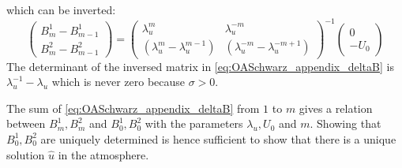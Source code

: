 which can be inverted:
\begin{equation}
	\label{eq:OASchwarz_appendix_deltaB}
	\begin{pmatrix}
B_m^1 - B_{m-1}^1\\
B_m^2 - B_{m-1}^2
	\end{pmatrix}
	=
	\begin{pmatrix}
		\lambda_u^m & \lambda_u^{-m} \\
		(\lambda_u^m - \lambda_u^{m-1})  & 
		(\lambda_u^{-m} - \lambda_u^{-m+1})
	\end{pmatrix}^{-1}
	\begin{pmatrix}
		0 \\ -U_0
	\end{pmatrix}
\end{equation}
The determinant of the inversed matrix in
\eqref{eq:OASchwarz_appendix_deltaB} is
$\lambda_u^{-1} - \lambda_u$ which is never zero because
$\sigma > 0$.
\par
The sum of \eqref{eq:OASchwarz_appendix_deltaB} from $1$ to $m$
gives a relation between $B^1_m, B^2_m$ and
$B^1_0, B^2_0$ with the parameters $\lambda_u, U_0$ and $m$.
Showing that $B^1_0, B^2_0$ are uniquely determined is hence
sufficient to show that there is a unique solution $\widehat{u}$
in the atmosphere.

